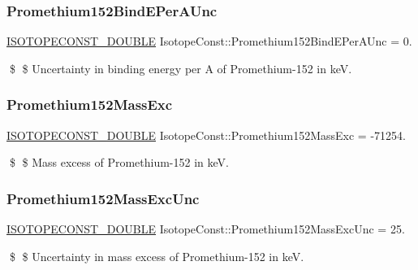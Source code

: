 \subsubsection{\texorpdfstring{Promethium152\+Bind\+E\+Per\+A\+Unc}{Promethium152BindEPerAUnc}}
{\footnotesize\ttfamily \mbox{\hyperlink{group___isotope_const-_macros_ga8f45a7272ce02c0b4c65c44636ed719a}{I\+S\+O\+T\+O\+P\+E\+C\+O\+N\+S\+T\+\_\+\+D\+O\+U\+B\+LE}} Isotope\+Const\+::\+Promethium152\+Bind\+E\+Per\+A\+Unc = 0.}

\$ \$ Uncertainty in binding energy per A of Promethium-\/152 in keV. \mbox{\label{group___isotope_const-_promethium-_pm152_gab63815025d92327d25de33e91cf5fcb5}} 
\subsubsection{\texorpdfstring{Promethium152\+Mass\+Exc}{Promethium152MassExc}}
{\footnotesize\ttfamily \mbox{\hyperlink{group___isotope_const-_macros_ga8f45a7272ce02c0b4c65c44636ed719a}{I\+S\+O\+T\+O\+P\+E\+C\+O\+N\+S\+T\+\_\+\+D\+O\+U\+B\+LE}} Isotope\+Const\+::\+Promethium152\+Mass\+Exc = -\/71254.}

\$ \$ Mass excess of Promethium-\/152 in keV. \mbox{\label{group___isotope_const-_promethium-_pm152_gaffb2bf2ca3be55d0dfc4396bdf692f6a}} 
\subsubsection{\texorpdfstring{Promethium152\+Mass\+Exc\+Unc}{Promethium152MassExcUnc}}
{\footnotesize\ttfamily \mbox{\hyperlink{group___isotope_const-_macros_ga8f45a7272ce02c0b4c65c44636ed719a}{I\+S\+O\+T\+O\+P\+E\+C\+O\+N\+S\+T\+\_\+\+D\+O\+U\+B\+LE}} Isotope\+Const\+::\+Promethium152\+Mass\+Exc\+Unc = 25.}

\$ \$ Uncertainty in mass excess of Promethium-\/152 in keV. \mbox{\label{group___isotope_const-_promethium-_pm152_gaed8b6e0a0dec3fde75bb967154944006}} 
